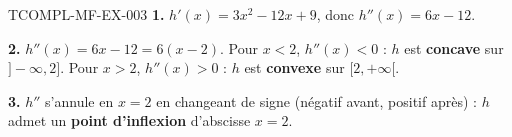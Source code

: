 \begin{corrige}{TCOMPL-MF-EX-003}
\textbf{1.} $h'(x) = 3x^2 - 12x + 9$, donc $h''(x) = 6x - 12$.

\textbf{2.} $h''(x) = 6x-12 = 6(x-2)$. Pour $x<2$, $h''(x)<0$ : $h$ est \textbf{concave} sur $]-\infty,2]$. Pour $x>2$, $h''(x)>0$ : $h$ est \textbf{convexe} sur $[2,+\infty[$.

\textbf{3.} $h''$ s'annule en $x=2$ en changeant de signe (négatif avant, positif après) : $h$ admet un \textbf{point d'inflexion} d'abscisse $x=2$.
\end{corrige}
